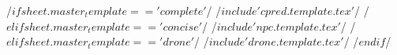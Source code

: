 /$if sheet.master_template == 'complete'$/
/$ include 'cpred.template.tex' $/
/$elif sheet.master_template == 'concise'$/
/$include 'npc.template.tex'$/
/$elif sheet.master_template == 'drone'$/
/$include 'drone.template.tex'$/
/$endif$/